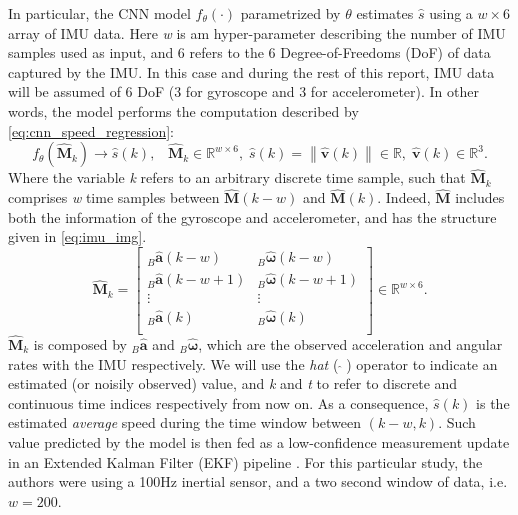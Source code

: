 In particular, the CNN model $f_\theta(\cdot)$ parametrized by $\theta$ estimates $\hat{s}$ using a $w\times6$ array of IMU data. 
Here \emph{w} is am hyper-parameter describing the number of IMU samples used as input, and 6 refers to the 6 Degree-of-Freedoms (DoF) of data captured by the IMU. 
In this case and during the rest of this report, IMU data will be assumed of 6 DoF (3 for gyroscope and 3 for accelerometer).
In other words, the model performs the computation described by \ref{eq:cnn_speed_regression}: 
\begin{equation}\label{eq:cnn_speed_regression}
    f_\theta\left(\mathbf{\hat{M}}_{k}\right) \rightarrow \hat{s}(k), \;\;\; \mathbf{\hat{M}}_{k}\in\mathbb{R}^{w\times6}, \;\hat{s}(k)=\left \| \mathbf{\hat{v}}(k)\right \|\in\mathbb{R}, \; \mathbf{\hat{v}}(k)\in\mathbb{R}^3.
\end{equation}
Where the variable \emph{k} refers to an arbitrary discrete time sample, such that $\mathbf{\hat{M}}_k$ comprises \emph{w} time samples between $\mathbf{\hat{M}}\!\left(k-w\right)$ and  $\mathbf{\hat{M}}\!\left(k\right)$. 
Indeed, $\mathbf{\hat{M}}$ includes both the information of the gyroscope and accelerometer, and has the structure given in \ref{eq:imu_img}.
\begin{equation}\label{eq:imu_img}
    \mathbf{\hat{M}}_k = \begin{bmatrix}
        _{B}\mathbf{\hat{a}}(k-w) & _{B}\mathbf{\hat{\boldsymbol{\omega}}}(k-w)\\ 
        _{B}\mathbf{\hat{a}}(k-w+1) & _{B}\mathbf{\hat{\boldsymbol{\omega}}}(k-w+1)\\ 
        \vdots & \vdots \\ 
        _{B}\mathbf{\hat{a}}(k) & _{B}\mathbf{\hat{\boldsymbol{\omega}}}(k)\\  
        \end{bmatrix} \in\mathbb{R}^{w\times6}.
\end{equation}
$\mathbf{\hat{M}}_k$ is composed by $_{B}\mathbf{\hat{a}}$ and $_{B}\mathbf{\hat{\boldsymbol{\omega}}}$, which are the observed acceleration and angular rates with the IMU respectively.
We will use the \emph{hat} ($\;\hat{}\;$) operator to indicate an estimated (or noisily observed) value, and \emph{k} and \emph{t} to refer to discrete and continuous time indices respectively from now on.
As a consequence, $\hat{s}(k)$ is the estimated \emph{average} speed during the time window between $(k-w, k)$. 
Such value predicted by the model is then fed as a low-confidence measurement update in an Extended Kalman Filter (EKF) pipeline \cite{DBLP:journals/corr/SolinCRK17}. 
For this particular study, the authors were using a 100Hz inertial sensor, and a two second window of data, i.e. $w = 200$.

